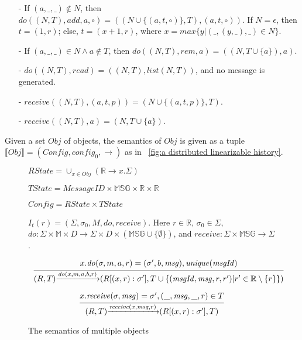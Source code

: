 \begin{example}[RGA]
\begin{itemize}
\item[-] If $(a,\_,\_) \notin N$, then $\mathit{do}((N,T),\mathit{add},a,\circ) = ((N \cup \{ (a,t,\circ) \},T),(a,t,\circ))$. If $N = \epsilon$, then $t = (1,r)$; else, $t = (x+1,r)$, where $x = \mathit{max}\{ y \vert (\_,(y,\_),\_) \in N \}$.

\item[-] If $(a,\_,\_) \in N \wedge a \notin T$, then $\mathit{do}((N,T),\mathit{rem},a) = ((N,T \cup \{ a \} ),a)$.

\item[-] $\mathit{do}((N,T),\mathit{read}) = ((N,T),\mathit{list}(N,T))$, and no message is generated.

\item[-] $\mathit{receive}((N,T),(a,t,p)) = (N \cup \{ (a,t,p) \},T)$.

\item[-] $\mathit{receive}((N,T),a) = (N,T \cup \{ a \})$.
\end{itemize}
\end{example}

 Given a set $\mathit{Obj}$ of objects, the semantics of $\mathit{Obj}$ is given as a tuple $\llbracket \mathit{Obj} \rrbracket = (\mathit{Config},\mathit{config}_0,\rightarrow)$ as in \figurename~\ref{fig:a distributed linearizable history}.

\begin{figure}[ht]
$\mathit{RState} = \cup_{x \in \mathit{Obj}} (\mathbb{R} \rightarrow x.\Sigma)$

$\mathit{TState} = \mathit{MessageID} \times \mathbb{MSG} \times \mathbb{R} \times \mathbb{R}$

$\mathit{Config} = \mathit{RState} \times \mathit{TState}$

$I_t(r) = (\Sigma, \sigma_0, M, \mathit{do},\mathit{receive})$. Here $r \in \mathbb{R}$, $\sigma_0 \in \Sigma$, $\mathit{do}:\Sigma \times \mathbb{M} \times D \rightarrow \Sigma \times D \times (\mathbb{MSG} \cup \{ \emptyset \} )$, and $\mathit{receive}: \Sigma \times \mathbb{MSG} \rightarrow \Sigma$.

\[
\begin{array}{l c}
\bigfrac{ x.\mathit{do}(\sigma,m,a,r) = (\sigma',b,\mathit{msg}), \mathit{unique}(\mathit{msgId}) }
{ (R,T) {\xrightarrow{\mathit{do}(x,m,a,b,r)}} (R[(x,r):\sigma'],T \cup \{ (\mathit{msgId},\mathit{msg},r,r') \vert r' \in \mathbb{R} \setminus \{ r \} \}) }
\end{array}
\]

\[
\begin{array}{l c}
\bigfrac{ x.\mathit{receive}(\sigma,\mathit{msg}) = \sigma',(\_,\mathit{msg},\_,r) \in T} 
{ (R,T) {\xrightarrow{\mathit{receive}(x,\mathit{msg},r)}} (R[(x,r):\sigma'],T) }
\end{array}
\]
\caption{The semantics of multiple objects}
\label{fig:the semantics of multiple objects}
\end{figure}

